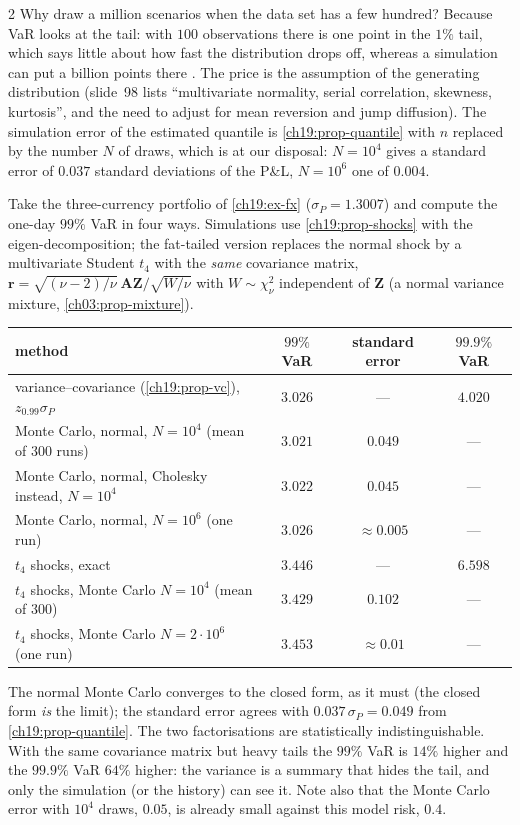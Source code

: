 \begin{paracol}{2}
Why draw a million scenarios when the data set has a few hundred? Because VaR looks at the tail: with $100$ observations there is one point in the $1\%$ tail, which says little about how fast the distribution drops off, whereas a simulation can put a billion points there . The price is the assumption of the generating distribution (slide~98 lists ``multivariate normality, serial correlation, skewness, kurtosis'', and the need to adjust for mean reversion and jump diffusion). The simulation error of the estimated quantile is \cref{ch19:prop-quantile} with $n$ replaced by the number $N$ of draws, which is at our disposal: $N=10^4$ gives a standard error of $0.037$ standard deviations of the P\&L, $N=10^6$ one of $0.004$.

\begin{casestudy}\label{ch19:cs-three}
Take the three-currency portfolio of \cref{ch19:ex-fx} ($\sigma_P=1.3007$) and compute the one-day $99\%$ VaR in four ways. Simulations use \cref{ch19:prop-shocks} with the eigen-decomposition; the fat-tailed version replaces the normal shock by a multivariate Student $t_4$ with the \emph{same} covariance matrix, $\bm r=\sqrt{(\nu-2)/\nu}\ \bm A\bm Z/\sqrt{W/\nu}$ with $W\sim\chi^2_\nu$ independent of $\bm Z$ (a normal variance mixture, \cref{ch03:prop-mixture}).
\begin{center}\small
\begin{tabular}{@{}lccc@{}}
\toprule
method & $99\%$ VaR & standard error & $99.9\%$ VaR\\
\midrule
variance--covariance (\cref{ch19:prop-vc}), $z_{0.99}\sigma_P$ & $3.026$ & --- & $4.020$\\
Monte Carlo, normal, $N=10^4$ (mean of $300$ runs) & $3.021$ & $0.049$ & --- \\
Monte Carlo, normal, Cholesky instead, $N=10^4$ & $3.022$ & $0.045$ & --- \\
Monte Carlo, normal, $N=10^6$ (one run) & $3.026$ & $\approx0.005$ & --- \\
$t_4$ shocks, exact & $3.446$ & --- & $6.598$\\
$t_4$ shocks, Monte Carlo $N=10^4$ (mean of $300$) & $3.429$ & $0.102$ & --- \\
$t_4$ shocks, Monte Carlo $N=2\cdot10^6$ (one run) & $3.453$ & $\approx0.01$ & --- \\
\bottomrule
\end{tabular}
\end{center}
The normal Monte Carlo converges to the closed form, as it must (the closed form \emph{is} the limit); the standard error agrees with $0.037\,\sigma_P=0.049$ from \cref{ch19:prop-quantile}. The two factorisations are statistically indistinguishable. With the same covariance matrix but heavy tails the $99\%$ VaR is $14\%$ higher and the $99.9\%$ VaR $64\%$ higher: the variance is a summary that hides the tail, and only the simulation (or the history) can see it. Note also that the Monte Carlo error with $10^4$ draws, $0.05$, is already small against this model risk, $0.4$.
\end{casestudy}


\end{paracol}
